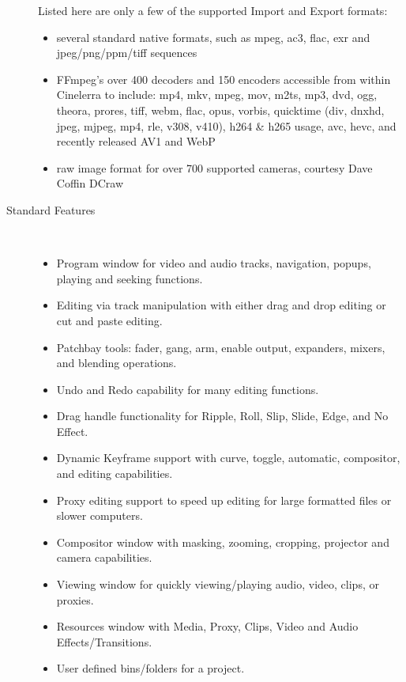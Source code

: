 \begin{description}
        Listed here are only a few of the supported Import and Export formats:
        \begin{itemize}
            \item  several standard native formats, such as mpeg, ac3, flac, exr and jpeg/png/ppm/tiff sequences
            \item FFmpeg’s over 400 decoders and 150 encoders accessible from within Cinelerra to include:
                mp4, mkv, mpeg, mov, m2ts, mp3, dvd, ogg, theora, prores, tiff, webm, flac, opus, vorbis,
                quicktime (div, dnxhd, jpeg, mjpeg, mp4, rle, v308, v410), h264 \& h265 usage, avc, hevc,
                and recently released AV1 and WebP
            \item raw image format for over 700 supported cameras, courtesy Dave Coffin DCraw
        \end{itemize}
        \item[Standard Features] ~\\
            \begin{itemize}
                \item Program window for video and audio tracks, navigation, popups, playing and seeking functions.
                \item Editing via track manipulation with either drag and drop editing or cut and paste editing.
                \item  Patchbay tools: fader, gang, arm, enable output, expanders, mixers, and blending operations.
                \item Undo and Redo capability for many editing functions.
                \item Drag handle functionality for Ripple, Roll, Slip, Slide, Edge, and No Effect.
                \item Dynamic Keyframe support with curve, toggle, automatic, compositor, and editing capabilities.
                \item Proxy editing support to speed up editing for large formatted files or slower computers.
                \item Compositor window with masking, zooming, cropping, projector and camera capabilities.
                \item Viewing window for quickly viewing/playing audio, video, clips, or proxies.
                \item Resources window with Media, Proxy, Clips, Video and Audio Effects/Transitions.
                \item User defined bins/folders for a project.

\end{itemize}
\end{description}
